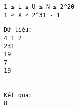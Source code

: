 \begin{verbatim}
1 ≤ L ≤ U ≤ N ≤ 2^20
1 ≤ X ≤ 2^31 - 1
\end{verbatim}
\begin{verbatim}
Dữ liệu:
4 1 2
231
19
7
19


Kết quả:
8
\end{verbatim}